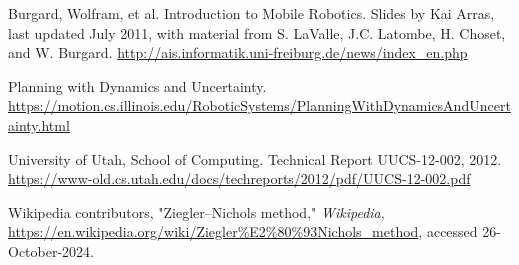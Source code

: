 \documentclass[12pt]{article}
\begin{document}
\begin{thebibliography}{}
\raggedright

Burgard, Wolfram, et al. Introduction to Mobile Robotics. Slides by Kai Arras, last updated July 2011, with material from S. LaValle, J.C. Latombe, H. Choset, and W. Burgard. \href{http://ais.informatik.uni-freiburg.de/news/index_en.php}{http://ais.informatik.uni-freiburg.de/news/index\_en.php}

Planning with Dynamics and Uncertainty. \href{https://motion.cs.illinois.edu/RoboticSystems/PlanningWithDynamicsAndUncertainty.html}
{https://motion.cs.illinois.edu/RoboticSystems/PlanningWithDynamicsAndUncertainty.html}

University of Utah, School of Computing. Technical Report UUCS-12-002, 2012. \href{https://www-old.cs.utah.edu/docs/techreports/2012/pdf/UUCS-12-002.pdf}{https://www-old.cs.utah.edu/docs/techreports/2012/pdf/UUCS-12-002.pdf}

Wikipedia contributors, "Ziegler–Nichols method," \textit{Wikipedia},
\url{https://en.wikipedia.org/wiki/Ziegler%E2%80%93Nichols_method}, accessed 26-October-2024.

\end{thebibliography}
\end{document}
